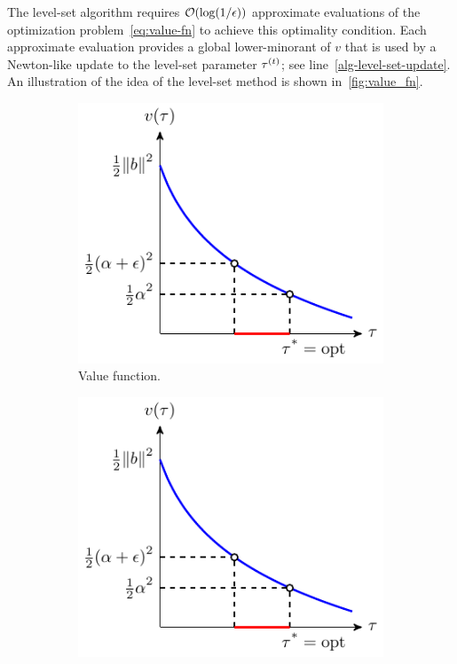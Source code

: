 The level-set algorithm requires $\mathcal{O}(\log(1/\epsilon))$ approximate evaluations of the optimization problem~\eqref{eq:value-fn} to achieve this optimality condition. Each approximate evaluation provides a global lower-minorant of $v$ that is used by a Newton-like update to the level-set parameter $\tau^{(t)}$; see line~\ref{alg-level-set-update}. An illustration of the idea of the level-set method is shown in~\autoref{fig:value_fn}. 

\begin{figure}[t] 
    \begin{subfigure}{.48\textwidth}
      \centering
      \includegraphics[width=\linewidth, page=1]{./figures/illustrations3}
      \captionsetup{justification=centering}
      \caption{Value function.}
    \end{subfigure}
    \hfill
    \begin{subfigure}{.48\textwidth}
      \centering
      \includegraphics[width=\linewidth, page=2]{./figures/illustrations3}

\end{subfigure}
\end{figure}

